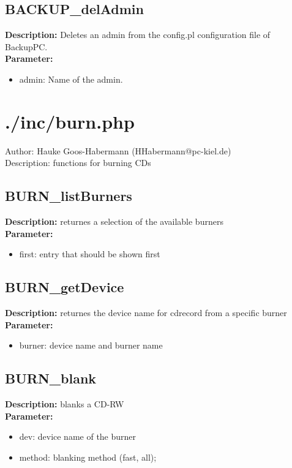 \subsection{BACKUP\_delAdmin}
\textbf{Description:} Deletes an admin from the config.pl configuration file of BackupPC.\\
\textbf{Parameter:}
\begin{itemize}
\item admin: Name of the admin.
\end{itemize}

\newpage\section{./inc/burn.php}
 Author: Hauke Goos-Habermann (HHabermann@pc-kiel.de)\\
 Description: functions for burning CDs\\

\subsection{BURN\_listBurners}
\textbf{Description:} returnes a selection of the available burners\\
\textbf{Parameter:}
\begin{itemize}
\item first: entry that should be shown first
\end{itemize}

\subsection{BURN\_getDevice}
\textbf{Description:} returnes the device name for cdrecord from a specific burner\\
\textbf{Parameter:}
\begin{itemize}
\item burner: device name and burner name
\end{itemize}

\subsection{BURN\_blank}
\textbf{Description:} blanks a CD-RW\\
\textbf{Parameter:}
\begin{itemize}
\item dev: device name of the burner
\item method: blanking method (fast, all);
\end{itemize}

